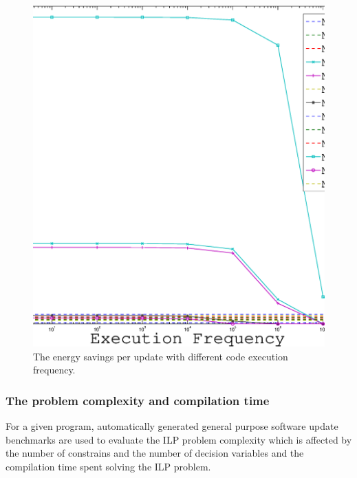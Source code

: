 \begin{figure}[htbp]
\centering
\includegraphics[scale=0.3]{figures/energy.eps}
\caption{The energy savings per update with different code execution frequency.}
\label{fexp.energy}
\end{figure}

\subsubsection{The problem complexity and compilation time}
For a given program, automatically generated general purpose software update
benchmarks are used to evaluate the ILP problem
complexity which is affected by the number of constrains and the number of
decision variables and the compilation time spent solving the ILP problem.

